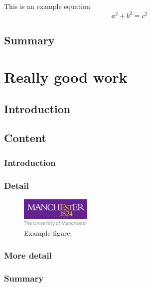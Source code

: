 \documentclass[times,thesis]{uom_thesis_casson} %
\begin{document}
  This is an example equation
  \begin{equation}
      a^{2} + b^{2} = c^{2}
  \end{equation}
  
  \section{Summary}
  \lipsum[6]
  
  
  
\chapter{Really good work}

  \section{Introduction}
  \lipsum[1] 
  
  \section{Content}
    \subsection{Introduction}
	\lipsum[1]
	
	\subsection{Detail}
    \lipsum[1-2] \cite{ref:jCAS10,ref:jCAS09,ref:jCAS09a} \lipsum[3-5]
	\begin{figure}
      \centering
      \includegraphics[width=0.3\textwidth]{uom_logo.pdf}
      \caption{Example figure.}
      \label{fig:uom_logo}
    \end{figure} 
    
	\subsection{More detail}
	\lipsum[1-2] \cite{ref:jCAS10,ref:jCAS09,ref:jCAS09a} \lipsum[3-5]
	
	\subsection{Summary}
	\lipsum[1]
  
\end{document}
